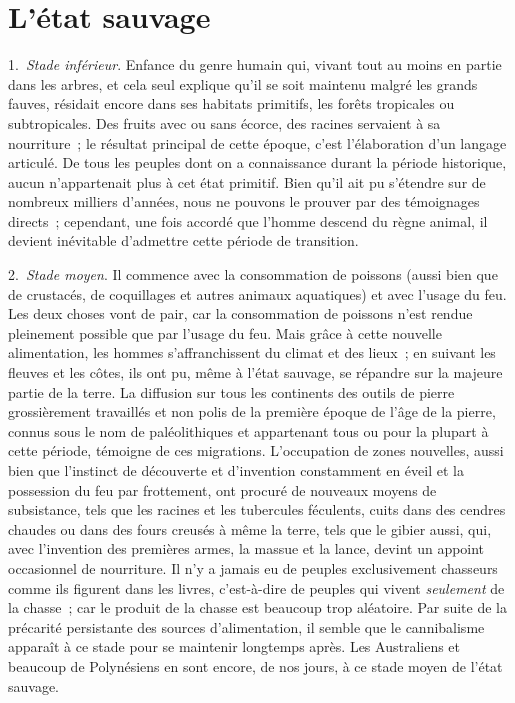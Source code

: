 \documentclass[french,twoside]{book} %
\begin{document}
\section[{L’état sauvage}]{L’état sauvage\protect\footnotemark }
\renewcommand{\leftmark}{L’état sauvage}

1. \emph{Stade inférieur}. Enfance du genre humain qui, vivant tout au moins en partie dans les arbres, et cela seul explique qu’il se soit maintenu malgré les grands fauves, résidait encore dans ses habitats primitifs, les forêts tropicales ou subtropicales. Des fruits avec ou sans écorce, des racines servaient à sa nourriture ; le résultat principal de cette époque, c’est l’élaboration d’un langage articulé. De tous les peuples dont on a connaissance durant la période historique, aucun n’appartenait plus à cet état primitif. Bien qu’il ait pu s’étendre sur de nombreux milliers d’années, nous ne pouvons le prouver par des témoignages directs ; cependant, une fois accordé que l’homme descend du règne animal, il devient inévitable d’admettre cette période de transition.\par
2. \emph{Stade moyen}. Il commence avec la consommation de poissons (aussi bien que de crustacés, de coquillages et autres animaux aquatiques) et avec l’usage du feu. Les deux choses vont de pair, car la consommation de poissons n’est rendue pleinement possible que par l’usage du feu. Mais grâce à cette nouvelle alimentation, les hommes s’affranchissent du climat et des lieux ; en suivant les fleuves et les côtes, ils ont pu, même à l’état sauvage, se répandre sur la majeure partie de la terre. La diffusion sur tous les continents des outils de pierre grossièrement travaillés et non polis de la première époque de l’âge de la pierre, connus sous le nom de paléolithiques et appartenant tous ou pour la plupart à cette période, témoigne de ces migrations. L’occupation de zones nouvelles, aussi bien que l’instinct de découverte et d’invention constamment en éveil et la possession du feu par frottement, ont procuré de nouveaux moyens de subsistance, tels que les racines et les tubercules féculents, cuits dans des cendres chaudes ou dans des fours creusés à même la terre, tels que le gibier aussi, qui, avec l’invention des premières armes, la massue et la lance, devint un appoint occasionnel de nourriture. Il n’y a jamais eu de peuples exclusivement chasseurs comme ils figurent dans les livres, c’est-à-dire de peuples qui vivent \emph{seulement} de la chasse ; car le produit de la chasse est beaucoup trop aléatoire. Par suite de la précarité persistante des sources d’alimentation, il semble que le cannibalisme apparaît à ce stade pour se maintenir longtemps après. Les Australiens et beaucoup de Polynésiens en sont encore, de nos jours, à ce stade moyen de l’état sauvage.\par
\end{document}
